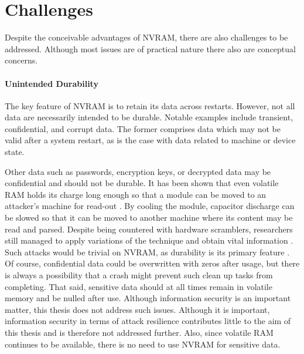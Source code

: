 

\section{Challenges}

Despite the conceivable advantages of NVRAM, there are also challenges to be
addressed. Although most issues are of practical nature there also are
conceptual concerns.

\paragraph{Unintended Durability}

The key feature of NVRAM is to retain its data across restarts. However, not all
data are necessarily intended to be durable. Notable examples include transient,
confidential, and corrupt data. The former comprises data which may not be valid
after a system restart, as is the case with data related to machine or device
state.

Other data such as passwords, encryption keys, or decrypted data may be
confidential and should not be durable. It has been shown that even volatile RAM
holds its charge long enough so that a module can be moved to an attacker's
machine for read-out \cite{halderman2008lest}. By cooling the module, capacitor
discharge can be slowed so that it can be moved to another machine where its
content may be read and parsed. Despite being countered with hardware
scramblers, researchers still managed to apply variations of the technique and
obtain vital information \cite{yitbarek2017cold}. Such attacks would be trivial
on NVRAM, as durability is its primary feature \cite{bailey2011operating}. Of
course, confidential data could be overwritten with zeros after usage, but there
is always a possibility that a crash might prevent such clean up tasks from
completing. That said, sensitive data should at all times remain in volatile
memory and be nulled after use. Although information security is an important
matter, this thesis does not address such issues. Although it is important,
information security in terms of attack resilience contributes little to the aim
of this thesis and is therefore not addressed further. Also, since volatile RAM continues to be available, there is no need to use NVRAM for sensitive data.


